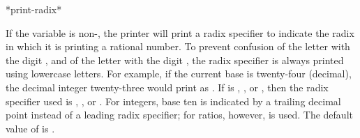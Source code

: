 \begin{defun}[Variable]
*print-radix*

If the variable  is non-{\false}, the printer will print a
radix specifier to indicate the radix in which it is printing a rational
number.  To prevent confusion of the letter  with the digit ,
and of the letter  with the digit , the radix specifier
is always printed using lowercase letters.
For example, if the current base is twenty-four (decimal), the
decimal integer twenty-three would print as .  If 
is , , or , then the radix specifier used is ,
, or .  For integers, base ten is indicated by a trailing
decimal point instead of a leading radix specifier; for ratios, however,
 is used.  The default value of  is {\false}.
\end{defun}

